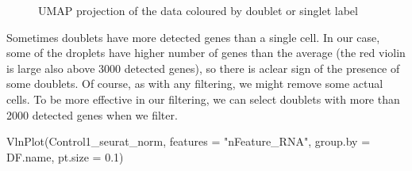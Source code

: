 \documentclass[
  letterpaper,
  DIV=11,
  numbers=noendperiod]{scrartcl}
\newenvironment{Shaded}{\begin{snugshade}}{\end{snugshade}}
\newcommand{\AttributeTok}[1]{\textcolor[rgb]{0.40,0.45,0.13}{#1}}
\newcommand{\FloatTok}[1]{\textcolor[rgb]{0.68,0.00,0.00}{#1}}
\newcommand{\FunctionTok}[1]{\textcolor[rgb]{0.28,0.35,0.67}{#1}}
\newcommand{\NormalTok}[1]{\textcolor[rgb]{0.00,0.23,0.31}{#1}}
\newcommand{\StringTok}[1]{\textcolor[rgb]{0.13,0.47,0.30}{#1}}
\begin{document}
\begin{figure}[H]


\caption{\label{fig-doublets}UMAP projection of the data coloured by
doublet or singlet label}

\end{figure}%

Sometimes doublets have more detected genes than a single cell. In our
case, some of the droplets have higher number of genes than the average
(the red violin is large also above 3000 detected genes), so there is
aclear sign of the presence of some doublets. Of course, as with any
filtering, we might remove some actual cells. To be more effective in
our filtering, we can select doublets with more than 2000 detected genes
when we filter.

\begin{Shaded}
\begin{Highlighting}[]
\FunctionTok{VlnPlot}\NormalTok{(Control1\_seurat\_norm, }\AttributeTok{features =} \StringTok{"nFeature\_RNA"}\NormalTok{, }\AttributeTok{group.by =}\NormalTok{ DF.name, }\AttributeTok{pt.size =} \FloatTok{0.1}\NormalTok{)}
\end{Highlighting}
\end{Shaded}
\end{document}
